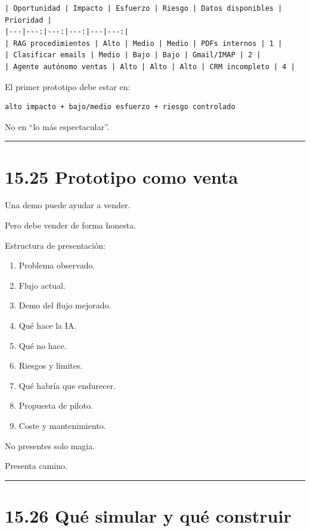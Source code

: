 \begin{lstlisting}
| Oportunidad | Impacto | Esfuerzo | Riesgo | Datos disponibles | Prioridad |
|---|---:|---:|---:|---|---:|
| RAG procedimientos | Alto | Medio | Medio | PDFs internos | 1 |
| Clasificar emails | Medio | Bajo | Bajo | Gmail/IMAP | 2 |
| Agente autónomo ventas | Alto | Alto | Alto | CRM incompleto | 4 |
\end{lstlisting}

El primer prototipo debe estar en:

\begin{lstlisting}
alto impacto + bajo/medio esfuerzo + riesgo controlado
\end{lstlisting}

No en ``lo más espectacular''.

\begin{center}\rule{0.5\linewidth}{0.5pt}\end{center}

\section{15.25 Prototipo como venta}\label{prototipo-como-venta}

Una demo puede ayudar a vender.

Pero debe vender de forma honesta.

Estructura de presentación:

\begin{enumerate}
\def\labelenumi{\arabic{enumi}.}
\tightlist
\item
  Problema observado.
\item
  Flujo actual.
\item
  Demo del flujo mejorado.
\item
  Qué hace la IA.
\item
  Qué no hace.
\item
  Riesgos y límites.
\item
  Qué habría que endurecer.
\item
  Propuesta de piloto.
\item
  Coste y mantenimiento.
\end{enumerate}

No presentes solo magia.

Presenta camino.

\begin{center}\rule{0.5\linewidth}{0.5pt}\end{center}

\section{15.26 Qué simular y qué
construir}\label{quuxe9-simular-y-quuxe9-construir}

